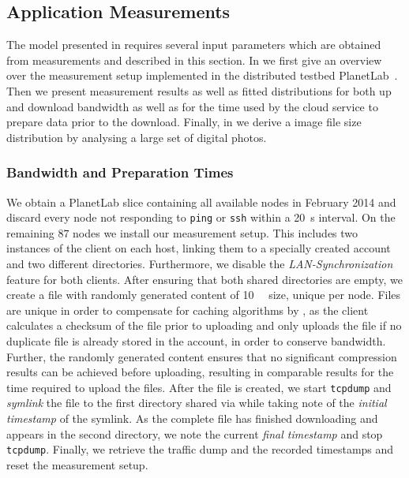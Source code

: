 \subsection{Application Measurements}\label{sec:application:cloud_file_synchronisation:application_measurements}
The model presented in  requires several input parameters which are obtained from measurements and described in this section.
In  we first give an overview over the measurement setup implemented in the distributed testbed PlanetLab~\cite{Chun2003}.
Then we present measurement results as well as fitted distributions for both up and download bandwidth as well as for the time used by the cloud service to prepare data prior to the download.
Finally, in  we derive a image file size distribution by analysing a large set of digital photos.

\subsubsection*{Bandwidth and Preparation Times}\label{sec:application:cloud_file_synchronisation:application_measurements:bandwidth_preparation_times}
We obtain a PlanetLab slice containing all available nodes in February 2014 and discard every node not responding to \texttt{ping} or \texttt{ssh} within a \SI{20}{\second} interval.
On the remaining \(87\) nodes we install our measurement setup.
This includes two instances of the \dropbox client on each host, linking them to a specially created \dropbox account and two different directories.
Furthermore, we disable the \emph{LAN-Synchronization} feature for both clients.
After ensuring that both shared directories are empty, we create a file with randomly generated content of \SI{10}{\mega\bit} size, unique per node.
Files are unique in order to compensate for caching algorithms by \dropbox, as the client calculates a checksum of the file prior to uploading and only uploads the file if no duplicate file is already stored in the account, in order to conserve bandwidth.
Further, the randomly generated content ensures that no significant compression results can be achieved before uploading, resulting in comparable results for the time required to upload the files.
After the file is created, we start \texttt{tcpdump} and \emph{symlink} the file to the first directory shared via \dropbox while taking note of the \emph{initial timestamp} of the symlink.
As the complete file has finished downloading and appears in the second \dropbox directory, we note the current \emph{final timestamp} and stop \texttt{tcpdump}.
Finally, we retrieve the traffic dump and the recorded timestamps and reset the measurement setup.

